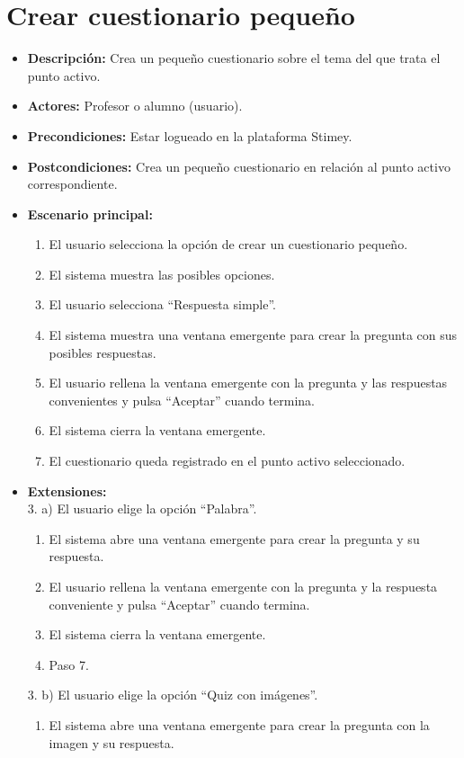 \documentclass[12pt,letterpaper]{article}
\begin{document}
\section{Crear cuestionario pequeño}
\begin{itemize}
	\item \textbf{Descripción:} Crea un pequeño cuestionario sobre el tema del que trata el punto activo.
	\item \textbf{Actores:} Profesor o alumno (usuario).
	\item \textbf{Precondiciones:} Estar logueado en la plataforma Stimey.
	\item \textbf{Postcondiciones:} Crea un pequeño cuestionario en relación al punto activo correspondiente.
	\item \textbf{Escenario principal:}
	\begin{enumerate}
		\item El usuario selecciona la opción de crear un cuestionario pequeño.
		\item El sistema muestra las posibles opciones.
		\item El usuario selecciona ``Respuesta simple''.
		\item El sistema muestra una ventana emergente para crear la pregunta con sus posibles respuestas.
		\item El usuario rellena la ventana emergente con la pregunta y las respuestas convenientes y pulsa ``Aceptar'' cuando termina.
		\item El sistema cierra la ventana emergente.
		\item El cuestionario queda registrado en el punto activo seleccionado.
	\end{enumerate}
	\item \textbf{Extensiones:} \\3. a) El usuario elige la opción ``Palabra''.
	\begin{enumerate}
		\item El sistema abre una ventana emergente para crear la pregunta y su respuesta.
		\item El usuario rellena la ventana emergente con la pregunta y la respuesta conveniente y pulsa ``Aceptar'' cuando termina.
		\item El sistema cierra la ventana emergente.
		\item Paso 7.
	\end{enumerate}
	3. b) El usuario elige la opción ``Quiz con imágenes''.
	\begin{enumerate}
		\item El sistema abre una ventana emergente para crear la pregunta con la imagen y su respuesta.

\end{enumerate}
\end{itemize}
\end{document}
